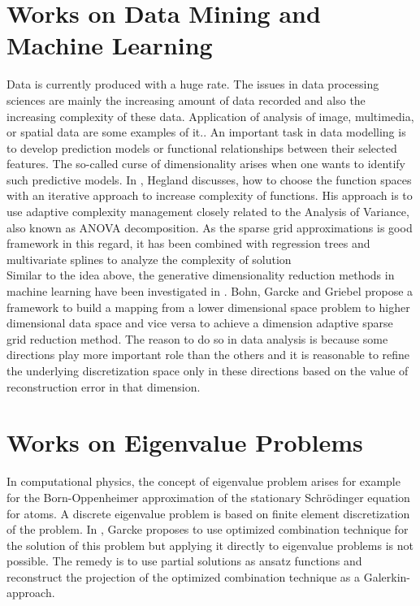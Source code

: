 \section{Works on Data Mining and Machine Learning}
Data is currently produced with a huge rate. The issues in data processing sciences are mainly the increasing amount of data recorded and also the increasing complexity of these data. Application of analysis of image, multimedia, or spatial data are some examples of it.. An important task in data modelling is to develop prediction models or functional relationships between their selected features. The so-called curse of dimensionality arises when one wants to identify such predictive models. In \cite{Hegland2003}, Hegland discusses, how to choose the function spaces with an iterative approach to increase complexity of functions. His approach is to use adaptive complexity management closely related to the Analysis of Variance, also known as ANOVA decomposition. As the sparse grid approximations is good framework in this regard, it has been combined with regression trees and multivariate splines to analyze the complexity of solution\\

Similar to the idea above, the generative dimensionality reduction methods in machine learning have been investigated in \cite{Bohn2016}. Bohn, Garcke and Griebel propose a framework to build a  mapping from a lower dimensional space problem to higher dimensional data space and vice versa to achieve a dimension adaptive sparse grid reduction method. The reason to do so in data analysis is because some directions play more important role than the others and it is reasonable to refine the underlying discretization space only in these directions based on the value of reconstruction error in that dimension.\\
\section{Works on Eigenvalue Problems}
In computational physics, the concept of eigenvalue problem arises for example for the Born-Oppenheimer approximation of the stationary Schr\"odinger equation for atoms. A discrete eigenvalue problem is based on finite element discretization of the problem. In \cite{Garcke2007}, Garcke proposes to use optimized combination technique for the solution of this problem but applying it directly to eigenvalue problems is not possible. The remedy is to use partial solutions as ansatz functions and reconstruct the projection of the optimized combination technique as a Galerkin-approach\cite{Garcke2007}.\\


